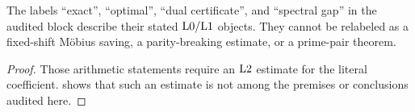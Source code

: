 \begin{corollary}
\label{cor:no-arithmetic-relabeling}
The labels ``exact'', ``optimal'', ``dual certificate'', and
``spectral gap'' in the audited block describe their stated
\(\mathrm{L0}/\mathrm{L1}\) objects.  They cannot be relabeled as a fixed-shift
M\"obius saving, a parity-breaking estimate, or a prime-pair theorem.
\end{corollary}

\begin{proof}
Those arithmetic statements require an \(\mathrm{L2}\) estimate for the
literal coefficient.   shows that such an
estimate is not among the premises or conclusions audited here.
\end{proof}

